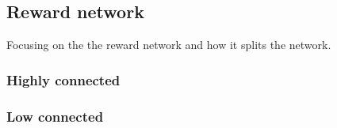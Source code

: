\subsection{Reward network} \label{s:n_ii:rwd}


Focusing on the the reward network and how it splits the network.

\subsubsection{Highly connected}

\subsubsection{Low connected}